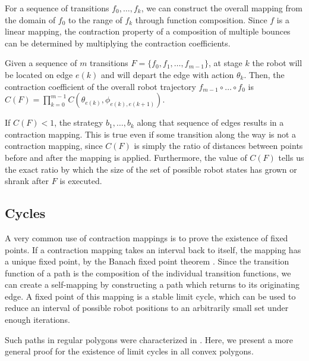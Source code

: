 \documentclass[]{styles/svproc}  %
\begin{document}
For a sequence of transitions $f_0, \ldots, f_k$, we can construct the overall
mapping from the domain of $f_0$ to the range of $f_k$ through function
composition. Since $f$ is a linear mapping, the contraction property of a composition 
of multiple bounces can be determined by multiplying the contraction
coefficients.

\begin{definition}
Given a sequence of $m$ transitions $F = \{f_0, f_1, \ldots, f_{m-1}\}$, at stage $k$ the robot 
will be located on edge $e(k)$ and will depart the edge with
action $\theta_k$. Then, the contraction coefficient of the overall robot
trajectory $f_{m-1} \circ \ldots \circ f_0$ is $C(F) = \prod_{k=0}^{m-1} C(\theta_{e(k)}, \phi_{e(k), e(k+1)})$.
\end{definition}

If $C(F) < 1$, the strategy $b_1, \ldots, b_k$ along that sequence of edges
results in a contraction mapping. This is true even if some transition along
the way is not a
contraction mapping, since $C(F)$ is simply the ratio of distances
between points before and after the mapping is applied. Furthermore, the value
of $C(F)$ tells us the exact ratio by which the
size of the set of possible robot states has grown or shrank after $F$ is
executed.


\subsection{Cycles} \label{sec:cycles}

A very common use of contraction mappings is to prove the existence of fixed
points. If a contraction mapping takes an interval back
to itself, the mapping has a unique fixed point, by the Banach fixed point
theorem \cite{Granas2003}. Since the transition function of a path is the
composition of the individual transition functions, we can create a self-mapping 
by constructing a path which returns to its originating edge. A fixed
point of this mapping is a stable limit cycle, which can be used to reduce an
interval of possible robot positions to an arbitrarily small set under enough
iterations.

Such paths in regular polygons were characterized in \cite{NilBecLav17}.
Here, we present a more general proof for the existence of limit cycles in all
convex polygons.
\end{document}
